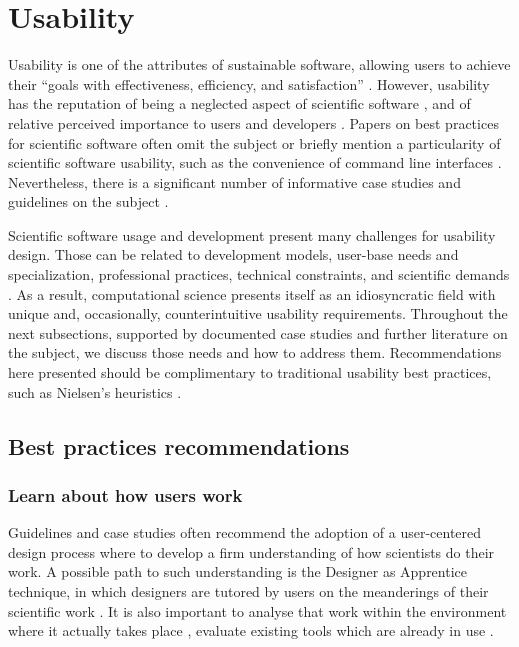 \section{Usability}
\label{sec:usability}

Usability is one of the attributes of sustainable software, allowing users to achieve their “goals with effectiveness, efficiency, and satisfaction” \cite[p.3]{Venters_WSSSPE}. However, usability has the reputation of being a neglected aspect of scientific software \cite{Ahmed:2014}, and of relative perceived importance to users and developers \cite{Nguyen-Hoan:2010, Hucka:2016}. Papers on best practices for scientific software often omit the subject \cite{Stodden_WSSSPE, Wilson:2016} or briefly mention a particularity of scientific software usability, such as the convenience of command line interfaces \cite{bestprSC}. Nevertheless, there is a significant number of informative case studies and guidelines on the subject \cite{MacLeod:1992, Springmeyer:1993, Pancake:1996, Javahery:2004, Schraefel:2004,Letondal:2004, Talbott:2005, Macaulay:2009, DeRoure:2009, Keefe:2010, DeMatos:2013, Ahmed:2014, Beg:2016}.

Scientific software usage and development present many challenges for usability design. Those can be related to development models, user-base needs and specialization, professional practices, technical constraints, and scientific demands \cite{Queiroz:2016}. As a result, computational science presents itself as an idiosyncratic field with unique and, occasionally, counterintuitive usability requirements. Throughout the next subsections, supported by documented case studies and further literature on the subject, we discuss those needs and how to address them. Recommendations here presented should be complimentary to traditional usability best practices, such as Nielsen's heuristics \cite{Nielsen:1994}.

\subsection{Best practices recommendations}


\subsubsection{Learn about how users work}

Guidelines and case studies often recommend the adoption of a user-centered design process where to develop a firm understanding of how scientists do their work.  A possible path to such understanding is the Designer as Apprentice technique, in which designers are tutored by users on the meanderings of their scientific work \cite{Springmeyer:1993}.  It is also important to analyse that work within the environment where it actually takes place \cite{Pancake:1996}, evaluate existing tools which are already in use \cite{Javahery:2004}.  

